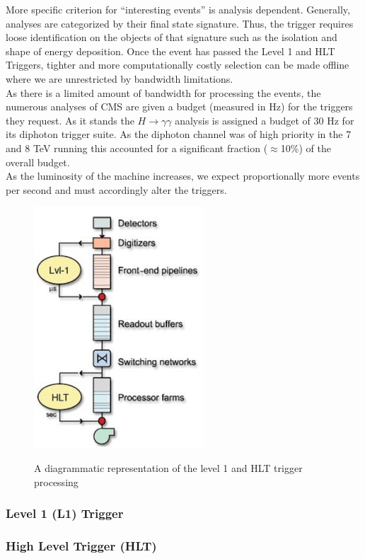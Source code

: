 More specific criterion for ``interesting events'' is analysis dependent. Generally, analyses are
 categorized by their final state signature. Thus, the trigger requires loose identification 
on the objects of that signature such as the isolation and shape of energy deposition. 
Once the event has passed the Level 1 and HLT Triggers, tighter and more computationally 
costly selection can be made offline where we are unrestricted by bandwidth limitations. \\

As there is a limited amount of bandwidth for processing the events, the numerous analyses of CMS
 are given a budget (measured in Hz) for the triggers they request. As it stands the $H\rightarrow \gamma\gamma$ 
analysis is assigned a budget of 30 Hz for its diphoton trigger suite. As the diphoton channel was of 
high priority in the 7 and 8 TeV running this accounted for a significant fraction ($\approx$10\%) of the overall budget. \\

As the luminosity of the machine increases, we expect proportionally more events per second and must accordingly alter the triggers. 

\begin{figure}
\begin{center}
\includegraphics[width=2.5in]{figures/exp_proj/cms-trigger}\\
\caption{A diagrammatic representation of the level 1 and HLT trigger processing}
\end{center}
\end{figure}


\subsubsection{Level 1 (L1) Trigger}

\subsubsection{High Level Trigger (HLT)}

